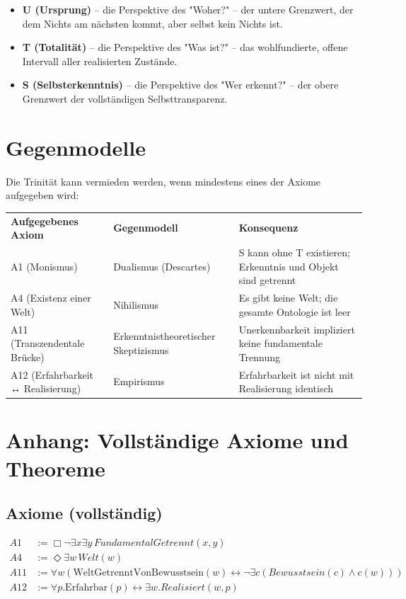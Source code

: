 \documentclass[
]{article}
\begin{document}
\begin{itemize}
\item \textbf{U (Ursprung)} – die Perspektive des "Woher?" – der untere Grenzwert, der dem Nichts am nächsten kommt, aber selbst kein Nichts ist.
\item \textbf{T (Totalität)} – die Perspektive des "Was ist?" – das wohlfundierte, offene Intervall aller realisierten Zustände.
\item \textbf{S (Selbsterkenntnis)} – die Perspektive des "Wer erkennt?" – der obere Grenzwert der vollständigen Selbsttransparenz.
\end{itemize}

\section{Gegenmodelle}\label{gegenmodelle}

Die Trinität kann vermieden werden, wenn mindestens eines der Axiome aufgegeben wird:

\begin{tabular}{lll}
\textbf{Aufgegebenes Axiom} & \textbf{Gegenmodell} & \textbf{Konsequenz} \\
A1 (Monismus) & Dualismus (Descartes) & S kann ohne T existieren; Erkenntnis und Objekt sind getrennt \\
A4 (Existenz einer Welt) & Nihilismus & Es gibt keine Welt; die gesamte Ontologie ist leer \\
A11 (Transzendentale Brücke) & Erkenntnistheoretischer Skeptizismus & Unerkennbarkeit impliziert keine fundamentale Trennung \\
A12 (Erfahrbarkeit ↔ Realisierung) & Empirismus & Erfahrbarkeit ist nicht mit Realisierung identisch \\
\end{tabular}

\section{Anhang: Vollständige Axiome und Theoreme}\label{anhang-vollstuxe4ndige-axiome-und-theoreme}

\subsection{Axiome (vollständig)}\label{axiome-vollstuxe4ndig}

\[
\begin{aligned}
A1 &:= \Box\neg\exists x\exists y\, FundamentalGetrennt(x,y) \\
A4 &:= \Diamond\exists w\, Welt(w) \\
A11 &:= \forall w \left( \text{WeltGetrenntVonBewusstsein}(w) \leftrightarrow \neg \exists c (Bewusstsein(c) \land c(w)) \right) \\
A12 &:= \forall p. \text{Erfahrbar}(p) \leftrightarrow \exists w. Realisiert(w, p)
\end{aligned}
\]
\end{document}
